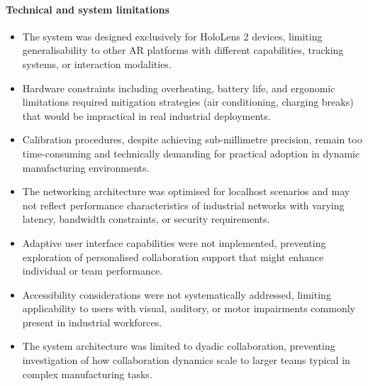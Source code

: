 \paragraph{Technical and system limitations}
\begin{itemize}
    \item The system was designed exclusively for HoloLens 2 devices, limiting generalisability to other AR platforms with different capabilities, tracking systems, or interaction modalities.
    \item Hardware constraints including overheating, battery life, and ergonomic limitations required mitigation strategies (air conditioning, charging breaks) that would be impractical in real industrial deployments.
    \item Calibration procedures, despite achieving sub-millimetre precision, remain too time-consuming and technically demanding for practical adoption in dynamic manufacturing environments.
    \item The networking architecture was optimised for localhost scenarios and may not reflect performance characteristics of industrial networks with varying latency, bandwidth constraints, or security requirements.
    \item Adaptive user interface capabilities were not implemented, preventing exploration of personalised collaboration support that might enhance individual or team performance.
    \item Accessibility considerations were not systematically addressed, limiting applicability to users with visual, auditory, or motor impairments commonly present in industrial workforces.
    \item The system architecture was limited to dyadic collaboration, preventing investigation of how collaboration dynamics scale to larger teams typical in complex manufacturing tasks.
\end{itemize}

